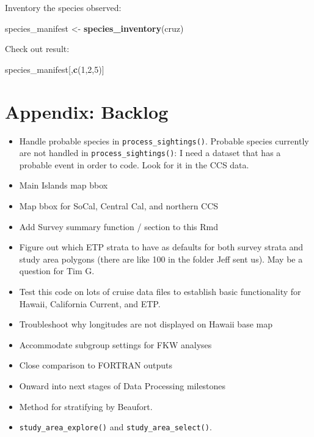 \documentclass[
]{book}
\newenvironment{Shaded}{\begin{snugshade}}{\end{snugshade}}
\newcommand{\DecValTok}[1]{\textcolor[rgb]{0.00,0.00,0.81}{#1}}
\newcommand{\KeywordTok}[1]{\textcolor[rgb]{0.13,0.29,0.53}{\textbf{#1}}}
\newcommand{\NormalTok}[1]{#1}
\newcommand{\StringTok}[1]{\textcolor[rgb]{0.31,0.60,0.02}{#1}}
\begin{document}
Inventory the species observed:

\begin{Shaded}
\begin{Highlighting}[]
\NormalTok{species_manifest <-}\StringTok{ }\KeywordTok{species_inventory}\NormalTok{(cruz) }
\end{Highlighting}
\end{Shaded}

Check out result:

\begin{Shaded}
\begin{Highlighting}[]
\NormalTok{species_manifest[,}\KeywordTok{c}\NormalTok{(}\DecValTok{1}\NormalTok{,}\DecValTok{2}\NormalTok{,}\DecValTok{5}\NormalTok{)]}
\end{Highlighting}
\end{Shaded}

\hypertarget{backlog}{%
\chapter{Appendix: Backlog}\label{backlog}}

\begin{itemize}
\item
  Handle probable species in \texttt{process\_sightings()}. Probable species currently are not handled in \texttt{process\_sightings()}: I need a dataset that has a probable event in order to code. Look for it in the CCS data.
\item
  Main Islands map bbox
\item
  Map bbox for SoCal, Central Cal, and northern CCS
\item
  Add Survey summary function / section to this Rmd
\item
  Figure out which ETP strata to have as defaults for both survey strata and study area polygons (there are like 100 in the folder Jeff sent us). May be a question for Tim G.
\item
  Test this code on lots of cruise data files to establish basic functionality for Hawaii, California Current, and ETP.
\item
  Troubleshoot why longitudes are not displayed on Hawaii base map
\item
  Accommodate subgroup settings for FKW analyses
\item
  Close comparison to FORTRAN outputs
\item
  Onward into next stages of Data Processing milestones
\item
  Method for stratifying by Beaufort.
\item
  \texttt{study\_area\_explore()} and \texttt{study\_area\_select()}.
\end{itemize}

  
\end{document}
